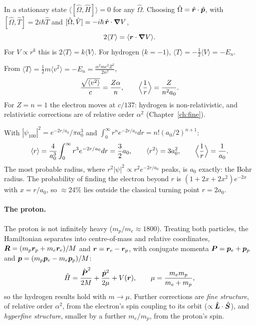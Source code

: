 \begin{theorem}
In a stationary state $\langle[\hat\Omega,\hat{H}]\rangle = 0$ for any $\hat\Omega$. Choosing $\hat\Omega = \hat{\bm{r}}\cdot\hat{\bm{p}}$, with $[\hat\Omega,\hat{T}] = 2i\hbar\hat{T}$ and $[\hat\Omega,\hat{V}] = -i\hbar\,\hat{\bm{r}}\cdot\grad V$,
\[
    2\langle T\rangle = \langle\bm{r}\cdot\grad V\rangle .
\]
For $V\propto r^k$ this is $2\langle T\rangle = k\langle V\rangle$. For hydrogen ($k = -1$), $\langle T\rangle = -\frac12\langle V\rangle = -E_n$.
\end{theorem}

\begin{example}
From $\langle T\rangle = \frac12m\langle v^2\rangle = -E_n = \frac{\alpha^2mc^2Z^2}{2n^2}$,
\[
    \frac{\sqrt{\langle v^2\rangle}}{c} = \frac{Z\alpha}{n},
    \qquad
    \Bigl\langle\frac1r\Bigr\rangle = \frac{Z}{n^2a_0}.
\]
For $Z = n = 1$ the electron moves at $c/137$: hydrogen is non-relativistic, and relativistic corrections are of relative order $\alpha^2$ (Chapter~\ref{ch:fine}).
\end{example}

\begin{example}
With $|\psi_{100}|^2 = e^{-2r/a_0}/\pi a_0^3$ and $\int_0^\infty r^ne^{-2r/a_0}dr = n!(a_0/2)^{n+1}$:
\[
    \langle r\rangle = \frac{4}{a_0^3}\int_0^\infty r^3e^{-2r/a_0}dr = \frac32a_0,
    \qquad
    \langle r^2\rangle = 3a_0^2,
    \qquad
    \Bigl\langle\frac1r\Bigr\rangle = \frac{1}{a_0}.
\]
The most probable radius, where $r^2|\psi|^2\propto r^2e^{-2r/a_0}$ peaks, is $a_0$ exactly: the Bohr radius. The probability of finding the electron beyond $r$ is $(1+2x+2x^2)e^{-2x}$ with $x = r/a_0$, so $\approx24\%$ lies outside the classical turning point $r = 2a_0$.
\end{example}

\paragraph{The proton.} The proton is not infinitely heavy ($m_p/m_e\approx1800$). Treating both particles, the Hamiltonian separates into centre-of-mass and relative coordinates, $\vect{R} = (m_p\lvect{r}_p + m_e\lvect{r}_e)/M$ and $\bm{r} = \bm{r}_e - \bm{r}_p$, with conjugate momenta $\vect{P} = \lvect{p}_e+\lvect{p}_p$ and $\bm{p} = (m_p\bm{p}_e - m_e\bm{p}_p)/M$:
\[
    \hat{H} = \frac{\hat{\vect{P}}^2}{2M} + \frac{\hat{\lvect{p}}^2}{2\mu} + V(\lvect{r}),
    \qquad
    \mu = \frac{m_em_p}{m_e+m_p},
\]
so the hydrogen results hold with $m\to\mu$. Further corrections are \emph{fine structure}, of relative order $\alpha^2$, from the electron's spin coupling to its orbit ($\propto\hat{\bm{L}}\cdot\hat{\bm{S}}$), and \emph{hyperfine structure}, smaller by a further $m_e/m_p$, from the proton's spin.

